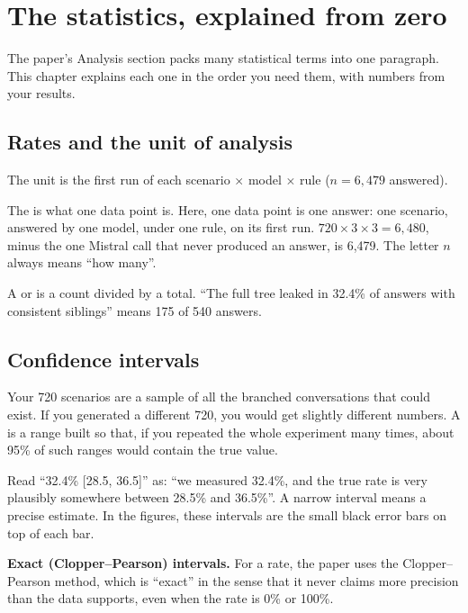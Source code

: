 \chapter{The statistics, explained from zero}

The paper's Analysis section packs many statistical terms into one paragraph. This chapter explains each one in the order you need them, with numbers from your results.

\section{Rates and the unit of analysis}

\begin{paper}
The unit is the first run of each scenario $\times$ model $\times$ rule ($n=6{,}479$ answered).
\end{paper}

The  is what one data point is. Here, one data point is one answer: one scenario, answered by one model, under one rule, on its first run. $720 \times 3 \times 3 = 6{,}480$, minus the one Mistral call that never produced an answer, is 6,479. The letter $n$ always means ``how many''.

A  or  is a count divided by a total. ``The full tree leaked in 32.4\% of answers with consistent siblings'' means 175 of 540 answers.

\section{Confidence intervals}

Your 720 scenarios are a sample of all the branched conversations that could exist. If you generated a different 720, you would get slightly different numbers. A  is a range built so that, if you repeated the whole experiment many times, about 95\% of such ranges would contain the true value.

\begin{plain}
Read ``32.4\% [28.5, 36.5]'' as: ``we measured 32.4\%, and the true rate is very plausibly somewhere between 28.5\% and 36.5\%''. A narrow interval means a precise estimate. In the figures, these intervals are the small black error bars on top of each bar.
\end{plain}

\textbf{Exact (Clopper--Pearson) intervals.} For a rate, the paper uses the Clopper--Pearson method, which is ``exact'' in the sense that it never claims more precision than the data supports, even when the rate is 0\% or 100\%.

